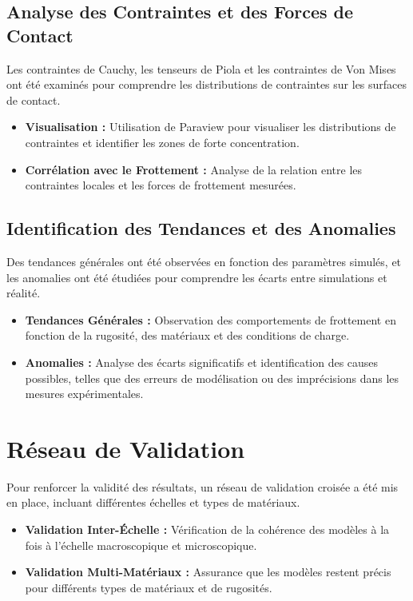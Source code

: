\subsection{Analyse des Contraintes et des Forces de Contact}
Les contraintes de Cauchy, les tenseurs de Piola et les contraintes de Von Mises ont été examinés pour comprendre les distributions de contraintes sur les surfaces de contact.
\begin{itemize}
    \item \textbf{Visualisation :} Utilisation de Paraview pour visualiser les distributions de contraintes et identifier les zones de forte concentration.
    \item \textbf{Corrélation avec le Frottement :} Analyse de la relation entre les contraintes locales et les forces de frottement mesurées.
\end{itemize}

\subsection{Identification des Tendances et des Anomalies}
Des tendances générales ont été observées en fonction des paramètres simulés, et les anomalies ont été étudiées pour comprendre les écarts entre simulations et réalité.
\begin{itemize}
    \item \textbf{Tendances Générales :} Observation des comportements de frottement en fonction de la rugosité, des matériaux et des conditions de charge.
    \item \textbf{Anomalies :} Analyse des écarts significatifs et identification des causes possibles, telles que des erreurs de modélisation ou des imprécisions dans les mesures expérimentales.
\end{itemize}

\section{Réseau de Validation}
Pour renforcer la validité des résultats, un réseau de validation croisée a été mis en place, incluant différentes échelles et types de matériaux.
\begin{itemize}
    \item \textbf{Validation Inter-Échelle :} Vérification de la cohérence des modèles à la fois à l'échelle macroscopique et microscopique.
    \item \textbf{Validation Multi-Matériaux :} Assurance que les modèles restent précis pour différents types de matériaux et de rugosités.
\end{itemize}